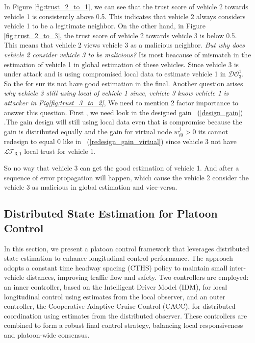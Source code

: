 \documentclass[letterpaper, 10pt, conference]{ieeeconf}  %
\def\eqref#1{(\ref{#1})}
\def\DO{\mathcal{DO}} %
\def\LT{\mathcal{LT}} %
\begin{document}
In Figure \ref{fig:trust_2_to_1}, we can see that the trust score of vehicle 2 towards vehicle 1 is consistently above 0.5. This indicates that vehicle 2 always considers vehicle 1 to be a legitimate neighbor. 
On the other hand, in Figure \ref{fig:trust_2_to_3}, the trust score of vehicle 2 towards vehicle 3 is below 0.5. This means that vehicle 2 views vehicle 3 as a malicious neighbor. 
\textit{But why does vehicle 2 consider vehicle 3 to be malicious?} Its most beacause of mismatch in the estimation of vehicle 1 in global estimation of these vehicles. Since vehicle 3 is under attack and is using compromised local data to estimate vehicle 1 in $\DO_3^1$. So the for sur its not have good estimation in the final.
Another question arises \textit{why vehicle 3 still using local of vehicle 1 since, vehicle 3 know vehicle 1 is attacker in Fig\ref{fig:trust_3_to_2}}, We need to mention 2 factor importance to answer this question. First , we need look in the designed gain ~\eqref{design_gain} 
.The gain design will still using local data even that is compromise because the gain is distributed equally and the gain for virtual node $w_{i0}^j > 0$ its cannot redesign to equal $0$ like in ~\eqref{redesign_gain_virtual} since vehicle 3 not have $\LT_{3,1}$ local trust for vehicle 1. 

So no way that vehicle 3 can get the good estimation of vehicle 1. And after a sequence of error propagation will happen, which cause the vehicle 2 consider the vehicle 3 as malicious in global estimation and vice-versa.



\subsection{Distributed State Estimation for Platoon Control}
In this section, we present a platoon control framework that leverages distributed state estimation to enhance longitudinal control performance. The approach adopts a constant time headway spacing (CTHS) policy to maintain small inter-vehicle distances, improving traffic flow and safety. Two controllers are employed: an inner controller, based on the Intelligent Driver Model (IDM), for local longitudinal control using estimates from the local observer, and an outer controller, the Cooperative Adaptive Cruise Control (CACC), for distributed coordination using estimates from the distributed observer. These controllers are combined to form a robust final control strategy, balancing local responsiveness and platoon-wide consensus.
\end{document}
